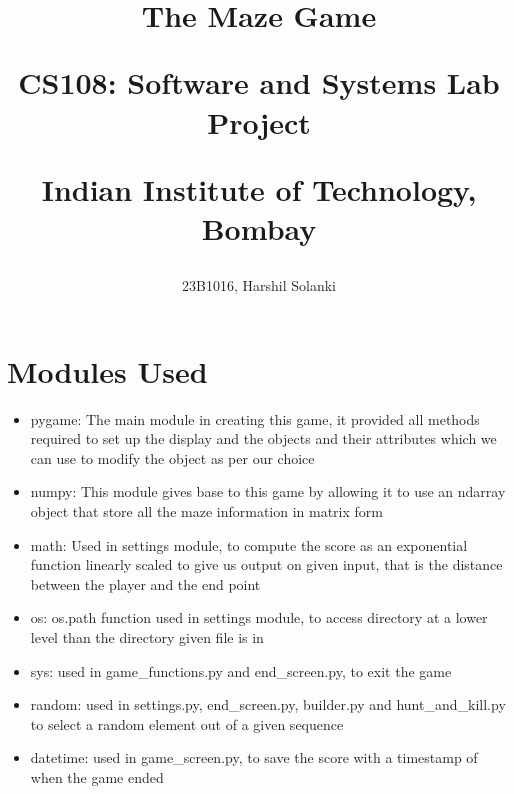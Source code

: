 \documentclass{article}
\begin{document}
\title{
{\Huge\textbf{The Maze Game}}\\[2cm]
\begin{flushleft}
    CS108: Software and Systems Lab Project
\end{flushleft}
\begin{flushright}
    Indian Institute of Technology, Bombay
\end{flushright}
}
\author{23B1016, Harshil Solanki}
\date{}
\maketitle
\tableofcontents
\clearpage


\section{Modules Used}
\begin{itemize}
    \item pygame: The main module in creating this game, it provided all methods required to set up the display and the objects and their attributes which we can use to modify the object as per our choice
    \item numpy: This module gives base to this game by allowing it to use an ndarray object that store all the maze information in matrix form
    \item math: Used in settings module, to compute the score as an exponential function linearly scaled to give us output on given input, that is the distance between the player and the end point
    \item os: os.path function used in settings module, to access directory at a lower level than the directory given file is in
    \item sys: used in game\_functions.py and end\_screen.py, to exit the game
    \item random: used in settings.py, end\_screen.py, builder.py and hunt\_and\_kill.py to select a random element out of a given sequence 
    \item datetime: used in game\_screen.py, to save the score with a timestamp of when the game ended 
\end{itemize}
\end{document}
